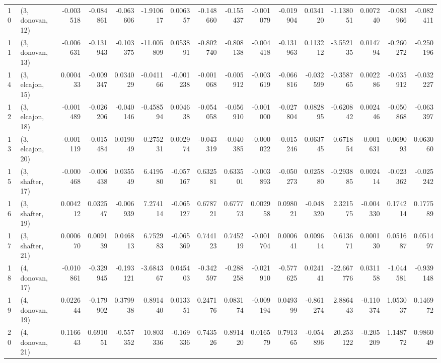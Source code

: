 \begin{tabular}{llrrrrrrrrrrrrrr}
10 &  (3, donovan, 12) &  -0.003518 & -0.084861 & -0.063606 &  -1.910617 &  0.006357 &  -0.148660 & -0.155437 & -0.001079 & -0.019904 &  0.034120 &  -1.138051 &  0.007240 & -0.083966 & -0.082411 \\
11 &  (3, donovan, 13) &  -0.006631 & -0.131943 & -0.103375 & -11.005809 &  0.053891 &  -0.802740 & -0.808138 & -0.004418 & -0.131963 &  0.113212 &  -3.552135 &  0.014794 & -0.260272 & -0.250196 \\
14 &  (3, elcajon, 15) &   0.000433 & -0.009347 &  0.034029 &  -0.041166 & -0.001238 &  -0.001068 & -0.005912 & -0.003619 & -0.066816 & -0.032599 &  -0.358765 &  0.002286 & -0.035912 & -0.032227 \\
12 &  (3, elcajon, 18) &  -0.001489 & -0.026206 & -0.040146 &  -0.458594 &  0.004638 &  -0.054058 & -0.056910 & -0.001000 & -0.027804 &  0.082895 &  -0.620842 &  0.002446 & -0.050868 & -0.063397 \\
13 &  (3, elcajon, 20) &  -0.001119 & -0.015484 &  0.019049 &  -0.275231 &  0.002974 &  -0.043319 & -0.040385 & -0.000022 & -0.015246 &  0.063745 &   0.671854 & -0.001631 &  0.069093 &  0.063060 \\
15 &  (3, shafter, 17) &  -0.000468 & -0.006438 &  0.035549 &   6.419580 & -0.057167 &   0.632581 &  0.633501 & -0.003893 & -0.050273 &  0.025880 &  -0.293885 &  0.002414 & -0.023362 & -0.025242 \\
16 &  (3, shafter, 19) &   0.004212 &  0.032547 & -0.006939 &   7.274114 & -0.065127 &   0.678721 &  0.677773 &  0.002958 &  0.098021 & -0.048320 &   2.321575 & -0.004330 &  0.174214 &  0.177589 \\
17 &  (3, shafter, 21) &   0.000670 &  0.009139 &  0.046813 &   6.752983 & -0.065369 &   0.744123 &  0.745219 & -0.001704 &  0.000641 &  0.009614 &   0.613671 &  0.000130 &  0.051687 &  0.051497 \\
18 &  (4, donovan, 17) &  -0.010861 & -0.329945 & -0.193121 &  -3.684367 &  0.045403 &  -0.342597 & -0.288258 & -0.021910 & -0.577625 &  0.024141 & -22.667776 &  0.031158 & -1.044581 & -0.939148 \\
19 &  (4, donovan, 19) &   0.022644 & -0.179902 &  0.379938 &   0.891440 &  0.013351 &   0.247176 &  0.083174 & -0.009194 &  0.049399 & -0.861274 &   2.886443 & -0.110374 &  1.053037 &  0.146972 \\
20 &  (4, donovan, 21) &   0.116643 &  0.691051 & -0.557352 &  10.803336 & -0.169336 &   0.743526 &  0.891420 &  0.016579 &  0.791365 & -0.054896 &  20.253122 & -0.205209 &  1.148772 &  0.986049 \\

\end{tabular}
